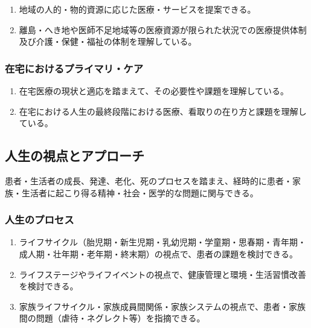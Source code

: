 \begin{enumerate}
\def\labelenumi{\arabic{enumi}.}
\tightlist
\item
  地域の人的・物的資源に応じた医療・サービスを提案できる。
\item
  離島・へき地や医師不足地域等の医療資源が限られた状況での医療提供体制及び介護・保健・福祉の体制を理解している。
\end{enumerate}

\hypertarget{ux5728ux5b85ux306bux304aux3051ux308bux30d7ux30e9ux30a4ux30deux30eaux30b1ux30a2}{%
\subsubsection{在宅におけるプライマリ・ケア}\label{ux5728ux5b85ux306bux304aux3051ux308bux30d7ux30e9ux30a4ux30deux30eaux30b1ux30a2}}

\begin{enumerate}
\def\labelenumi{\arabic{enumi}.}
\tightlist
\item
  在宅医療の現状と適応を踏まえて、その必要性や課題を理解している。
\item
  在宅における人生の最終段階における医療、看取りの在り方と課題を理解している。
\end{enumerate}

\hypertarget{ux4ebaux751fux306eux8996ux70b9ux3068ux30a2ux30d7ux30edux30fcux30c1}{%
\subsection{人生の視点とアプローチ}\label{ux4ebaux751fux306eux8996ux70b9ux3068ux30a2ux30d7ux30edux30fcux30c1}}

患者・生活者の成長、発達、老化、死のプロセスを踏まえ、経時的に患者・家族・生活者に起こり得る精神・社会・医学的な問題に関与できる。

\hypertarget{ux4ebaux751fux306eux30d7ux30edux30bbux30b9}{%
\subsubsection{人生のプロセス}\label{ux4ebaux751fux306eux30d7ux30edux30bbux30b9}}

\begin{enumerate}
\def\labelenumi{\arabic{enumi}.}
\tightlist
\item
  ライフサイクル（胎児期・新生児期・乳幼児期・学童期・思春期・青年期・成人期・壮年期・老年期・終末期）の視点で、患者の課題を検討できる。
\item
  ライフステージやライフイベントの視点で、健康管理と環境・生活習慣改善を検討できる。
\item
  家族ライフサイクル・家族成員間関係・家族システムの視点で、患者・家族間の問題（虐待・ネグレクト等）を指摘できる。
\end{enumerate}

